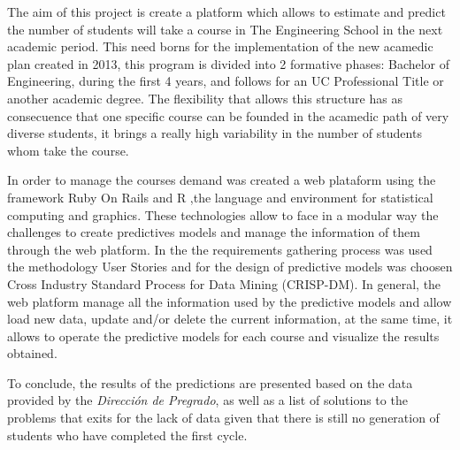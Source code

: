 The aim of this project is create a platform which allows to estimate and predict the number of students will take a course in The Engineering School in the next academic period.
This need borns for the implementation of the new acamedic plan created in 2013, this program is divided into 2 formative phases: Bachelor of Engineering, during the first 4 years, and
follows for an UC Professional Title or another academic degree. The flexibility that allows this structure has as consecuence that one specific course can be founded in the acamedic
path of very diverse students, it brings a really high variability in the number of students whom take the course.\

In order to manage the courses demand was created a web plataform using the framework Ruby On Rails and R ,the language and environment for statistical computing and graphics. These
technologies allow to face in a modular way the challenges to create predictives models and manage the information of them through the web platform. In the the requirements gathering process
was used the methodology User Stories and for the design of predictive models was choosen Cross Industry Standard Process for Data Mining (CRISP-DM). In general, the web platform manage
all the information used by the predictive models and allow load new data, update and/or delete the current information, at the same time, it allows to operate the predictive models
for each course and visualize the results obtained.\

To conclude, the results of the predictions are presented based on the data provided by the \textit{Dirección de Pregrado}, as well as a list of solutions to the problems that exits for
the lack of data given that there is still no generation of students who have completed the first cycle.\
